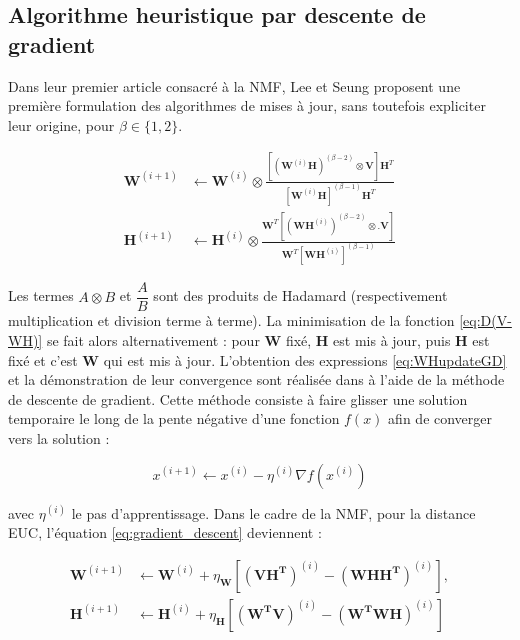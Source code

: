 \subsection{Algorithme heuristique par descente de gradient}

Dans leur premier article consacré à la NMF, Lee et Seung \cite{lee_learning_1999} proposent une première formulation des algorithmes de mises à jour, sans toutefois expliciter leur origine,  pour $\beta  \in \lbrace 1,2 \rbrace$.

\begin{subequations}\label{eq:WHupdateGD}
\begin{align}
\textbf{W}^{(i+1)} &\leftarrow \textbf{W}^{(i)}\otimes\frac{\left[\left(\textbf{W}^{(i)}\mathbf{H} \right)^{(\beta-2)}\otimes\textbf{V} \right]\textbf{H}^T}{\left[\textbf{W}^{(i)}\mathbf{H} \right]^{(\beta-1)}\textbf{H}^T}\\
\textbf{H}^{(i+1)} &\leftarrow \textbf{H}^{(i)}\otimes\frac{\textbf{W}^T \left[\left(\textbf{WH}^{(i)} \right)^{(\beta-2)}\otimes.\textbf{V} \right]}{\textbf{W}^T \left[\textbf{WH}^{(i)} \right]^{(\beta-1)}}
\end{align}
\end{subequations}

Les termes $A\otimes B$ et $\dfrac{A}{B}$ sont des produits de Hadamard (respectivement multiplication et division terme à terme). La minimisation de la fonction \ref{eq:D(V-WH)} se fait alors alternativement : pour $\mathbf{W}$ fixé, $\mathbf{H}$ est mis à jour, puis $\mathbf{H}$ est fixé et c'est $\mathbf{W}$ qui est mis à jour.
L'obtention des expressions \ref{eq:WHupdateGD} et la démonstration de leur convergence sont réalisée dans \cite{lee_algorithms_2000} à l'aide de la méthode de descente de gradient. Cette méthode consiste à faire \og glisser \fg {} une solution temporaire le long de la pente négative d'une fonction $f(x)$ afin de converger vers la solution \cite{kivinen_exponentiated_1994} :

\begin{equation}\label{eq:gradient_descent}
x^{(i+1)} \leftarrow x^{(i)} - \eta^{(i)} \nabla f(x^{(i)})
\end{equation}

avec $\eta^{(i)}$ le pas d'apprentissage. Dans le cadre de la NMF, pour la distance EUC, l'équation \ref{eq:gradient_descent} deviennent :

\begin{subequations}\label{eq:WHgradientDescente}
    \begin{align}
     \mathbf{W}^{(i+1)} & \leftarrow \mathbf{W}^{(i)}+\eta_{\mathbf{W}}\left[ \left(\mathbf{V H^T}\right)^{(i)} - \left(\mathbf{W H H^T}\right)^{(i)} \right ], \\
      \mathbf{H}^{(i+1)} & \leftarrow \mathbf{H}^{(i)}+\eta_{\mathbf{H}}\left[ \left(\mathbf{W^TV}\right)^{(i)}-\left(\mathbf{W^T W H} \right)^{(i)}\right ]
    \end{align}
\end{subequations}


